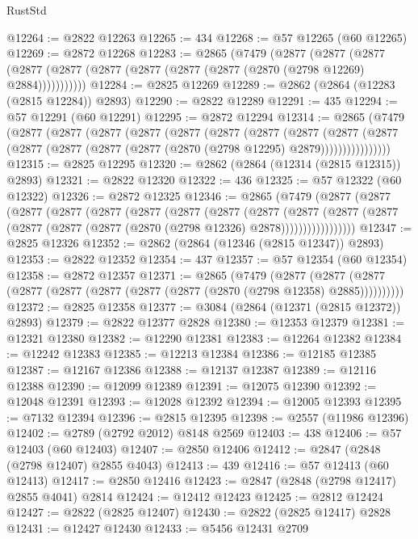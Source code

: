 \begin{lexlean}{RustStd}
\begin{coremodule}
@12264 := @2822 @12263
@12265 := 434
@12268 := @57 @12265 (@60 @12265)
@12269 := @2872 @12268
@12283 := @2865
    (@7479
      (@2877
        (@2877
          (@2877 (@2877 (@2877 (@2877 (@2877 (@2877 (@2877 (@2870 (@2798 @12269) @2884)))))))))))
@12284 := @2825 @12269
@12289 := @2862 (@2864 (@12283 (@2815 @12284)) @2893)
@12290 := @2822 @12289
@12291 := 435
@12294 := @57 @12291 (@60 @12291)
@12295 := @2872 @12294
@12314 := @2865
    (@7479
      (@2877
        (@2877
          (@2877
            (@2877
              (@2877
                (@2877
                  (@2877
                    (@2877
                      (@2877
                        (@2877
                          (@2877 (@2877 (@2877 (@2877 (@2870 (@2798 @12295) @2879))))))))))))))))
@12315 := @2825 @12295
@12320 := @2862 (@2864 (@12314 (@2815 @12315)) @2893)
@12321 := @2822 @12320
@12322 := 436
@12325 := @57 @12322 (@60 @12322)
@12326 := @2872 @12325
@12346 := @2865
    (@7479
      (@2877
        (@2877
          (@2877
            (@2877
              (@2877
                (@2877
                  (@2877
                    (@2877
                      (@2877
                        (@2877
                          (@2877
                            (@2877 (@2877 (@2877 (@2877 (@2870 (@2798 @12326) @2878)))))))))))))))))
@12347 := @2825 @12326
@12352 := @2862 (@2864 (@12346 (@2815 @12347)) @2893)
@12353 := @2822 @12352
@12354 := 437
@12357 := @57 @12354 (@60 @12354)
@12358 := @2872 @12357
@12371 := @2865
    (@7479
      (@2877 (@2877 (@2877 (@2877 (@2877 (@2877 (@2877 (@2877 (@2870 (@2798 @12358) @2885))))))))))
@12372 := @2825 @12358
@12377 := @3084 (@2864 (@12371 (@2815 @12372)) @2893)
@12379 := @2822 @12377 @2828
@12380 := @12353 @12379
@12381 := @12321 @12380
@12382 := @12290 @12381
@12383 := @12264 @12382
@12384 := @12242 @12383
@12385 := @12213 @12384
@12386 := @12185 @12385
@12387 := @12167 @12386
@12388 := @12137 @12387
@12389 := @12116 @12388
@12390 := @12099 @12389
@12391 := @12075 @12390
@12392 := @12048 @12391
@12393 := @12028 @12392
@12394 := @12005 @12393
@12395 := @7132 @12394
@12396 := @2815 @12395
@12398 := @2557 (@11986 @12396)
@12402 := @2789 (@2792 @2012) @8148 @2569
@12403 := 438
@12406 := @57 @12403 (@60 @12403)
@12407 := @2850 @12406
@12412 := @2847 (@2848 (@2798 @12407) @2855 @4043)
@12413 := 439
@12416 := @57 @12413 (@60 @12413)
@12417 := @2850 @12416
@12423 := @2847 (@2848 (@2798 @12417) @2855 @4041) @2814
@12424 := @12412 @12423
@12425 := @2812 @12424
@12427 := @2822 (@2825 @12407)
@12430 := @2822 (@2825 @12417) @2828
@12431 := @12427 @12430
@12433 := @5456 @12431 @2709

\end{coremodule}
\end{lexlean}
